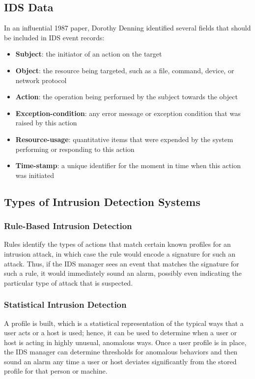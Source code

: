 \subsection{IDS Data} 
In an influential 1987 paper, Dorothy Denning identified several fields that should be included in IDS event records:
\begin{itemize}
\item \textbf{Subject}: the initiator of an action on the target
\item \textbf{Object}: the resource being targeted, such as a file, command, device, or network protocol
\item \textbf{Action}: the operation being performed by the subject towards the object
\item \textbf{Exception-condition}: any error message or exception condition that was raised by this action
\item \textbf{Resource-usage}: quantitative items that were expended by the system performing or responding to this action
\item \textbf{Time-stamp}: a unique identifier for the moment in time when this action was initiated
\end{itemize}
\subsection{Types of Intrusion Detection Systems} 
\subsubsection{Rule-Based Intrusion Detection} 
Rules identify the types of actions that match certain known profiles for an intrusion attack, in which case the rule would encode a signature for such an attack. Thus, if the IDS manager sees an event that matches the signature for such a rule, it would immediately sound an alarm, possibly even indicating the particular type of attack that is suspected.
\subsubsection{Statistical Intrusion Detection}
A profile is built, which is a statistical representation of the typical ways that a user acts or a host is used; hence, it can be used to determine when a user or host is acting in highly unusual, anomalous ways.
Once a user profile is in place, the IDS manager can determine thresholds for anomalous behaviors and then sound an alarm any time a user or host deviates significantly from the stored profile for that person or machine.
